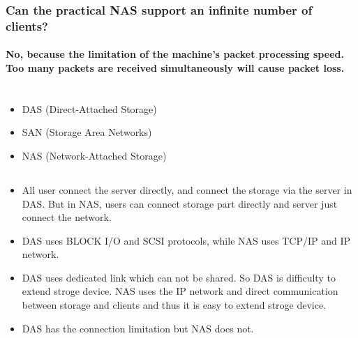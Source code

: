 \documentclass{article}
\begin{document}
            \subsubsection{ Can the practical NAS support an infinite number of clients?}
                \paragraph{
                    No, because the limitation of the machine's packet processing speed. Too many packets are received simultaneously will cause packet loss.
                }
    \section{}
        \subsection{}
            \begin{itemize}
                \item DAS (Direct-Attached Storage)
                \item SAN (Storage Area Networks)
                \item NAS (Network-Attached Storage)
            \end{itemize}
        \subsection{}
            \begin{itemize}
                \item All user connect the server directly, and connect the storage via the server in DAS. But in NAS, users can connect storage part directly and server just connect the network.
                \item DAS uses BLOCK I/O and SCSI protocols, while NAS uses TCP/IP and IP network.
                \item DAS uses dedicated link which can not be shared. So DAS is difficulty to extend stroge device. NAS uses the IP network and direct communication between storage and clients and thus it is easy to extend stroge device.
                \item DAS has the connection limitation but NAS does not.               
            \end{itemize}
    \section{}
\end{document}
